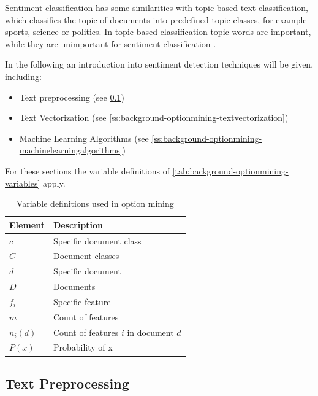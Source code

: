 Sentiment classification has some similarities with topic-based text classification, which classifies the topic of documents into predefined topic classes, for example sports, science or politics.
In topic based classification topic words are important, while they are unimportant for sentiment classification \cite[page 412f]{Liu2007}.

In the following an introduction into sentiment detection techniques will be given, including:

\begin{itemize}
    \item Text preprocessing (see \cref{ss:background-optionmining-textpreprocessing})
    \item Text Vectorization (see \cref{ss:background-optionmining-textvectorization})
    \item Machine Learning Algorithms (see \cref{ss:background-optionmining-machinelearningalgorithms})
\end{itemize}

For these sections the variable definitions of \autoref{tab:background-optionmining-variables} apply.

\begin{table}
	\begin{center}
		\begin{tabular}{l l}
			\textbf{Element} & \textbf{Description} \\ \hline
			$c$ & Specific document class \\
			$C$ & Document classes \\
			$d$ & Specific document \\
			$D$ & Documents \\
			$f_i$ & Specific feature \\
			$m$ & Count of features \\
			$n_i(d)$ & Count of features $i$ in document $d$ \\
			$P(x)$ & Probability of x \\
		\end{tabular}

        \caption{Variable definitions used in option mining}
        \label{tab:background-optionmining-variables}
	\end{center}
\end{table}

\subsection{Text Preprocessing}
\label{ss:background-optionmining-textpreprocessing}

